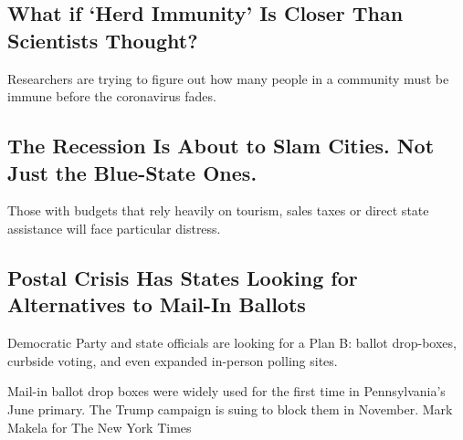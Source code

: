\href{/2020/08/17/health/coronavirus-herd-immunity.html}{}

\hypertarget{what-if-herd-immunity-is-closer-than-scientists-thought}{%
\subsection{What if `Herd Immunity' Is Closer Than Scientists
Thought?}\label{what-if-herd-immunity-is-closer-than-scientists-thought}}

Researchers are trying to figure out how many people in a community must
be immune before the coronavirus fades.

\href{/2020/08/17/upshot/pandemic-recession-cities-fiscal-shortfall.html}{}

\href{/2020/08/17/upshot/pandemic-recession-cities-fiscal-shortfall.html}{}

\hypertarget{the-recession-is-about-to-slam-cities-not-just-the-blue-state-ones}{%
\subsection{The Recession Is About to Slam Cities. Not Just the
Blue-State
Ones.}\label{the-recession-is-about-to-slam-cities-not-just-the-blue-state-ones}}

Those with budgets that rely heavily on tourism, sales taxes or direct
state assistance will face particular distress.

\href{/2020/08/17/us/politics/postal-service-voting.html}{}

\hypertarget{postal-crisis-has-states-looking-for-alternatives-to-mail-in-ballots}{%
\subsection{Postal Crisis Has States Looking for Alternatives to Mail-In
Ballots}\label{postal-crisis-has-states-looking-for-alternatives-to-mail-in-ballots}}

Democratic Party and state officials are looking for a Plan B: ballot
drop-boxes, curbside voting, and even expanded in-person polling sites.

\href{/2020/08/17/us/politics/postal-service-voting.html}{}

Mail-in ballot drop boxes were widely used for the first time in
Pennsylvania's June primary. The Trump campaign is suing to block them
in November. Mark Makela for The New York Times

\href{/2020/08/17/us/politics/dejoy-postal-service-mail-in-voting.html}{}

